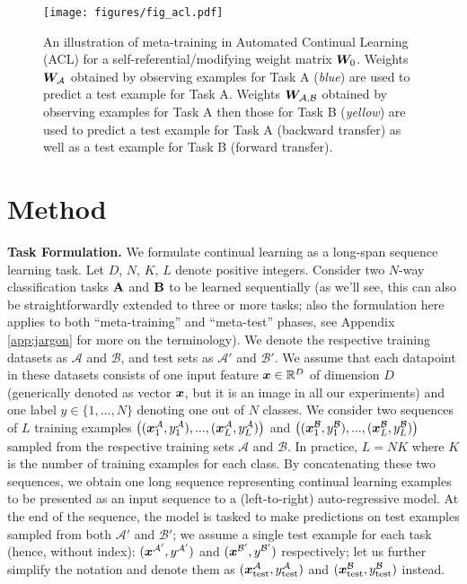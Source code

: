 \documentclass{article}
\begin{document}
\begin{figure}[t]
    \begin{center}
        \texttt{[image: figures/fig\_acl.pdf]}
        \caption{An illustration of meta-training in Automated Continual Learning (ACL) for a self-referential/modifying weight matrix ${\bm{W}}_0$. 
        Weights ${\bm{W}}_{\mathcal{A}}$ obtained by observing examples for Task A (\textit{blue}) are used to predict a test example for Task A.
        Weights ${\bm{W}}_{\mathcal{A}, \mathcal{B}}$ obtained by observing examples for Task A then those for Task B (\textit{yellow}) are used to predict a test example for Task A (backward transfer) as well as a test example for Task B (forward transfer).
        }
        \label{fig:acl}
    \end{center}
\end{figure}

\section{Method}
\label{sec:method}

\textbf{Task Formulation.} We formulate continual learning as a long-span sequence learning task.
Let $D$, $N$, $K$, $L$ denote positive integers.
Consider two $N$-way classification tasks ${\mathbf{A}}$ and ${\mathbf{B}}$ to be learned sequentially (as we'll see, this can also be straightforwardly extended to three or more tasks; also the formulation here applies to both ``meta-training'' and ``meta-test'' phases, see Appendix \ref{app:jargon} for more on the terminology).
We denote the respective training datasets as $\mathcal{A}$ and $\mathcal{B}$, and test sets as $\mathcal{A'}$ and $\mathcal{B'}$.
We assume that each datapoint in these datasets consists of one input feature ${\bm{x}} \in \mathbb{R}^D$ of dimension $D$ (generically denoted as vector ${\bm{x}}$, but it is an image in all our experiments) and one label $y \in \{1, ..., N\}$ denoting one out of $N$ classes.
We consider two sequences of $L$ training examples $\left(({\bm{x}}^{\mathcal{A}}_1, y^{\mathcal{A}}_1), ..., ({\bm{x}}^{\mathcal{A}}_L, y^{\mathcal{A}}_L)\right)$ and $\left(({\bm{x}}^{\mathcal{B}}_1, y^{\mathcal{B}}_1), ..., ({\bm{x}}^{\mathcal{B}}_L, y^{\mathcal{B}}_L)\right)$ sampled from the respective training sets $\mathcal{A}$ and $\mathcal{B}$.
In practice, $L=NK$ where $K$ is the number of training examples for each class.
By concatenating these two sequences, we obtain one long sequence representing continual learning examples to be presented as an input sequence to a (left-to-right) auto-regressive model.
At the end of the sequence, the model is tasked to make predictions on test examples sampled from both $\mathcal{A'}$ and $\mathcal{B'}$;
we assume a single test example for each task (hence, without index):
$({\bm{x}}^{\mathcal{A'}}, y^{\mathcal{A'}})$ and $({\bm{x}}^{\mathcal{B'}}, y^{\mathcal{B'}})$ respectively;
let us further simplify the notation and denote them as $({\bm{x}}^{\mathcal{A}}_\text{test}, y^{\mathcal{A}}_\text{test})$ and $({\bm{x}}^{\mathcal{B}}_\text{test}, y^{\mathcal{B}}_\text{test})$ instead.
\end{document}
